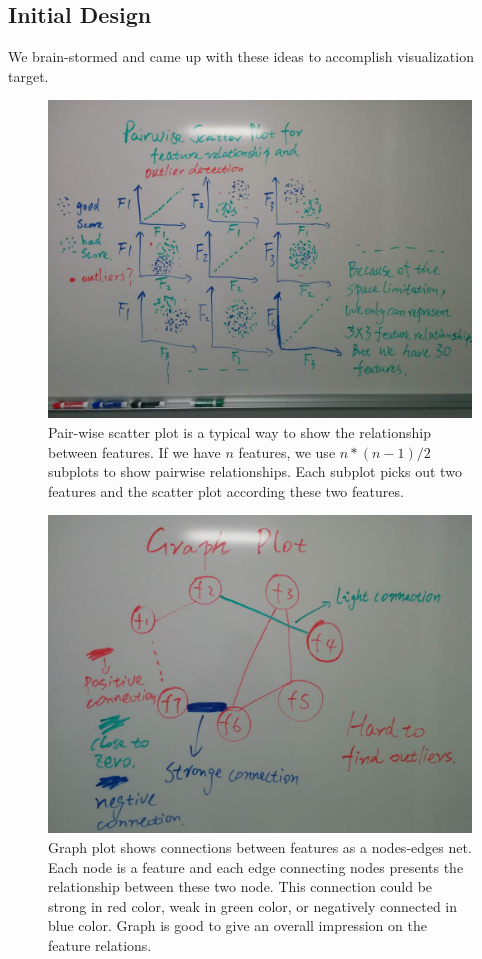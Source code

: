 \documentclass{article}
\begin{document}
\subsection{Initial Design}
We brain-stormed and came up with these ideas to accomplish visualization target.

\begin{figure}[H]
\centering
\includegraphics[scale=0.23]{pairwise_scatter.jpg}
\caption{Pair-wise scatter plot is a typical way to show the relationship between features. If we have $n$ features, we use $n*(n-1)/2$ subplots to show pairwise relationships. Each subplot picks out two features and the scatter plot according these two features.}
\end{figure}

\begin{figure}[H]
\centering
\includegraphics[scale=0.23]{graph.jpg}
\caption{Graph plot shows connections between features as a nodes-edges net. Each node is a feature and each edge connecting nodes presents the relationship between these two node. This connection could be strong in red color, weak in green color, or negatively connected in blue color. Graph is good to give an overall impression on the feature relations.}
\end{figure}
\end{document}
